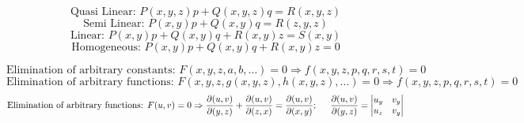 \documentclass{article}
\begin{document}
\begin{tcbraster}[raster equal height,raster valign=top,raster columns=2, raster rows=1]
\begin{tcolorbox}[colframe=SeaGreen, colback=SeaGreen!15, height=9cm, width = 25cm,title=\begin{center} \begin{Large} \textbf{Solutions of PDEs} \end{Large} \end{center}]
	\end{tcolorbox}
	\begin{tcolorbox}[boxsep=0pt,boxrule=0pt,colback=white,colframe=white]
		\begin{tcolorbox}[colframe=SeaGreen, colback=SeaGreen!15, height=4.25cm, width = 26.5cm, title=\begin{center} \begin{Large} \textbf{First Order PDE} \end{Large} \end{center}]
			$$\text{Quasi Linear: } P(x,y,z)p + Q(x,y,z)q = R(x,y,z)$$
			$$\text{Semi Linear: } P(x,y)p + Q(x,y)q = R(z,y,z)$$
			$$\text{Linear: } P(x,y)p + Q(x,y)q + R(x,y)z = S(x,y)$$
			$$\text{Homogeneous: } P(x,y)p + Q(x,y)q + R(x,y)z = 0$$
		\end{tcolorbox}
		\begin{tcolorbox}[colframe=SeaGreen, colback=SeaGreen!15, height=4.25cm, width = 26.5cm, title=\begin{center} \begin{Large} \textbf{Formation of a PDE} \end{Large} \end{center}]
			$$\text{Elimination of arbitrary constants: } F(x,y,z,a,b, \dots) = 0 \Rightarrow f(x,y,z,p,q,r,s,t)=0$$
			$$\text{Elimination of arbitrary functions: } F(x,y,z,g(x,y,z),h(x,y,z), \dots) = 0 \Rightarrow f(x,y,z,p,q,r,s,t)=0$$
			$$\text{Elimination of arbitrary functions: } F(u,v) = 0 \Rightarrow 
			\frac{\partial(u,v)}{\partial(y,z)} + \frac{\partial(u,v)}{\partial(z,x)} = \frac{\partial(u,v)}{\partial(x,y)}; \hspace{0.5cm}
			\frac{\partial(u,v)}{\partial(y,z)} = \mdet{u_y & v_y \\ u_z & v_y}$$
		\end{tcolorbox}
	\end{tcolorbox}
\end{tcbraster}

\end{document}
